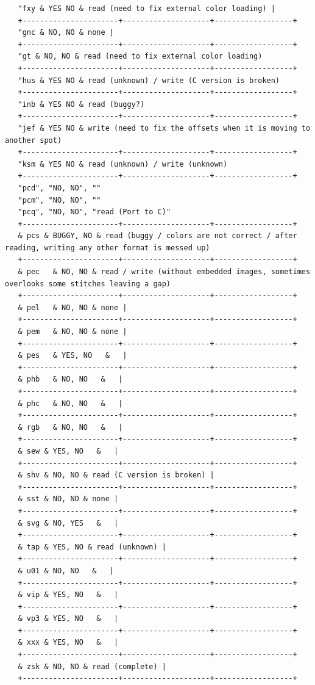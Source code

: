 \documentclass[10pt]{report}
\begin{document}
\begin{verbatim}
   "fxy & YES NO & read (need to fix external color loading) |
   +----------------------+--------------------+------------------+
   "gnc & NO, NO & none |
   +----------------------+--------------------+------------------+
   "gt & NO, NO & read (need to fix external color loading)
   +----------------------+--------------------+------------------+
   "hus & YES NO & read (unknown) / write (C version is broken)
   +----------------------+--------------------+------------------+
   "inb & YES NO & read (buggy?)
   +----------------------+--------------------+------------------+
   "jef & YES NO & write (need to fix the offsets when it is moving to another spot)
   +----------------------+--------------------+------------------+
   "ksm & YES NO & read (unknown) / write (unknown)
   +----------------------+--------------------+------------------+
   "pcd", "NO, NO", ""
   "pcm", "NO, NO", ""
   "pcq", "NO, NO", "read (Port to C)"
   +----------------------+--------------------+------------------+
   & pcs & BUGGY, NO & read (buggy / colors are not correct / after reading, writing any other format is messed up)
   +----------------------+--------------------+------------------+
   & pec   & NO, NO & read / write (without embedded images, sometimes overlooks some stitches leaving a gap)
   +----------------------+--------------------+------------------+
   & pel   & NO, NO & none |
   +----------------------+--------------------+------------------+
   & pem   & NO, NO & none |
   +----------------------+--------------------+------------------+
   & pes   & YES, NO   &   |
   +----------------------+--------------------+------------------+
   & phb   & NO, NO   &   |
   +----------------------+--------------------+------------------+
   & phc   & NO, NO   &   |
   +----------------------+--------------------+------------------+
   & rgb   & NO, NO   &   |
   +----------------------+--------------------+------------------+
   & sew & YES, NO   &   |
   +----------------------+--------------------+------------------+
   & shv & NO, NO & read (C version is broken) |
   +----------------------+--------------------+------------------+
   & sst & NO, NO & none |
   +----------------------+--------------------+------------------+
   & svg & NO, YES   &   |
   +----------------------+--------------------+------------------+
   & tap & YES, NO & read (unknown) |
   +----------------------+--------------------+------------------+
   & u01 & NO, NO   &   |
   +----------------------+--------------------+------------------+
   & vip & YES, NO   &   |
   +----------------------+--------------------+------------------+
   & vp3 & YES, NO   &   |
   +----------------------+--------------------+------------------+
   & xxx & YES, NO   &   |
   +----------------------+--------------------+------------------+
   & zsk & NO, NO & read (complete) |
   +----------------------+--------------------+------------------+
   

\end{verbatim}
\end{document}
